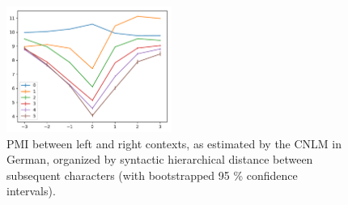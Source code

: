 \begin{figure}
\includegraphics[width=0.48\textwidth]{figures/segmentation-profile-pmis-german-all-heights-ci.pdf}
\caption{PMI between left and right contexts, as estimated by the CNLM in German, organized by syntactic hierarchical distance between subsequent characters (with bootstrapped 95 \% confidence intervals).}\label{fig:syntax-depth}
\end{figure}





